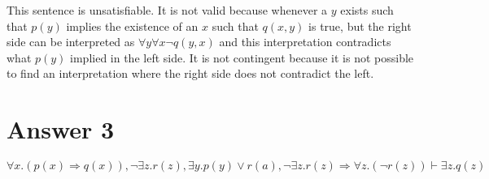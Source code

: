\documentclass[12pt]{article}
\begin{document}
This sentence is unsatisfiable. It is not valid because whenever a $y$ exists such that $p(y)$ implies the existence of an $x$ such that $q(x,y)$ is true, but the right side can be interpreted as $ \forall y \forall x \neg q(y,x)$ and this interpretation contradicts what $p(y)$ implied in the left side. It is not contingent because it is not possible to find an interpretation where the right side does not contradict the left.


\section*{Answer 3}

\[ \forall x.\left(p(x) \Rightarrow q(x)\right), \neg\exists z.r(z), \exists y.p(y) \lor r(a), \neg\exists z.r(z) \Rightarrow \forall z.\left(\neg r(z)\right) \vdash \exists z.q(z) \]
\end{document}
